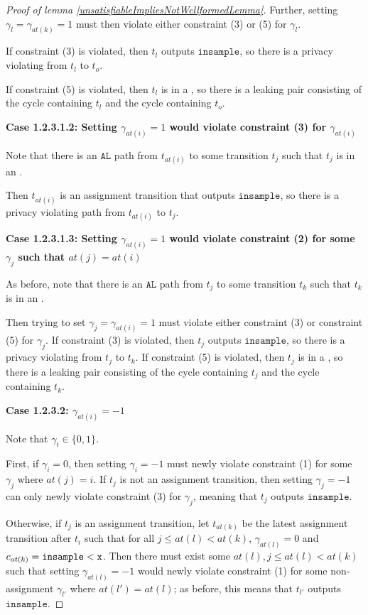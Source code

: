 \begin{proof}[Proof of lemma \ref{unsatisfiableImpliesNotWellformedLemma}]
    Further, setting $\gamma_l = \gamma_{at(k)} = 1$ must then violate either constraint (3) or (5) for $\gamma_l$. 

    If constraint (3) is violated, then $t_l$ outputs $\texttt{insample}$, so there is a privacy violating from $t_l$ to $t_o$.

    If constraint (5) is violated, then $t_l$ is in a \gcycle, so there is a leaking pair consisting of the cycle containing $t_l$ and the cycle containing $t_o$. 

    \textbf{Case 1.2.3.1.2: Setting $\gamma_{at(i)}=1$ would violate constraint (3) for $\gamma_{at(i)}$}

    Note that there is an $\texttt{AL}$ path from $t_{at(i)}$ to some transition $t_j$ such that $t_j$ is in an \lcycle.

    Then $t_{at(i)}$ is an assignment transition that outputs $\texttt{insample}$, so there is a privacy violating path from $t_{at(i)}$ to $t_j$. 
    
    \textbf{Case 1.2.3.1.3: Setting $\gamma_{at(i)}=1$ would violate constraint (2) for some $\gamma_j$ such that $at(j) = at(i)$}

    As before, note that there is an $\texttt{AL}$ path from $t_{j}$ to some transition $t_k$ such that $t_k$ is in an \lcycle.

    Then trying to set $\gamma_j = \gamma_{at(i)} = 1$ must violate either constraint (3) or constraint (5) for $\gamma_j$. If constraint (3) is violated, then $t_j$ outputs $\texttt{insample}$, so there is a privacy violating from $t_j$ to $t_k$. If constraint (5) is violated, then $t_j$ is in a \gcycle, so there is a leaking pair consisting of the cycle containing $t_j$ and the cycle containing $t_k$.  

    \textbf{Case 1.2.3.2: $\gamma_{at(i)} = -1$}

    Note that $\gamma_i \in \{0, 1\}$.

    First, if $\gamma_i = 0$, then setting $\gamma_i = -1$ must newly violate constraint (1) for some $\gamma_j$ where $at(j) = i$. If $t_{j}$ is not an assignment transition, then setting $\gamma_{j} = -1$ can only newly violate constraint (3) for $\gamma_{j}$, meaning that $t_j$ outputs $\texttt{insample}$.

    Otherwise, if $t_j$ is an assignment transition, let $t_{at(k)}$ be the latest assignment transition after $t_{i}$ such that for all $j\leq at(l)< at(k)$, $\gamma_{at(l)} =0$ and $c_{at(k)} = \lguard[\texttt{x}]$. Then there must exist some $at(l), j\leq at(l)< at(k)$ such that setting $\gamma_{at(l)}=-1$ would newly violate constraint (1) for some non-assignment $\gamma_{l'}$ where $at(l') = at(l)$; as before, this means that $t_{l'}$ outputs $\texttt{insample}$.  


\end{proof}
